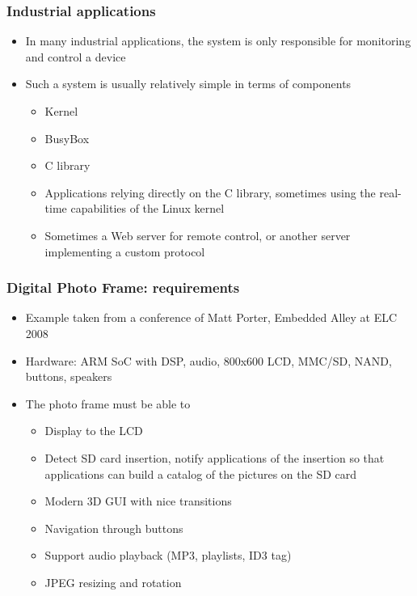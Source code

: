 \begin{frame}
  \frametitle{Industrial applications}
  \begin{itemize}
  \item In many industrial applications, the system is only
    responsible for monitoring and control a device
  \item Such a system is usually relatively simple in terms of
    components
    \begin{itemize}
    \item Kernel
    \item BusyBox
    \item C library
    \item Applications relying directly on the C library, sometimes
      using the real-time capabilities of the Linux kernel
    \item Sometimes a Web server for remote control, or another server
      implementing a custom protocol
    \end{itemize}
  \end{itemize}
\end{frame}

\begin{frame}
  \frametitle{Digital Photo Frame: requirements}
  \begin{itemize}
  \item Example taken from a conference of Matt Porter, Embedded Alley
    at ELC 2008
  \item Hardware: ARM SoC with DSP, audio, 800x600 LCD, MMC/SD, NAND,
    buttons, speakers
  \item The photo frame must be able to
    \begin{itemize}
    \item Display to the LCD
    \item Detect SD card insertion, notify applications of the
      insertion so that applications can build a catalog of the
      pictures on the SD card
    \item Modern 3D GUI with nice transitions
    \item Navigation through buttons
    \item Support audio playback (MP3, playlists, ID3 tag)
    \item JPEG resizing and rotation
    \end{itemize}
  \end{itemize}
\end{frame}

